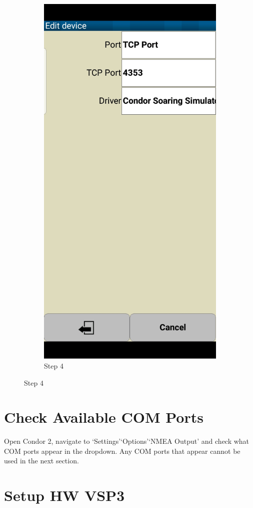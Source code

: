 \documentclass{article}
\begin{document}
\begin{figure}[h!]
\begin{subfigure}[b]{0.24\linewidth}
            \includegraphics[width=\linewidth]{images/Tophat-4.jpg}
            \caption{Step 4}
        \end{subfigure}
    \end{figure}

    \section{Check Available COM Ports}
    Open Condor 2, navigate to `Settings'\textrightarrow`Options'\textrightarrow`NMEA Output' and check what COM ports appear
    in the dropdown. Any COM ports that appear cannot be used in the next section.

    \section{Setup HW VSP3}
\end{document}
